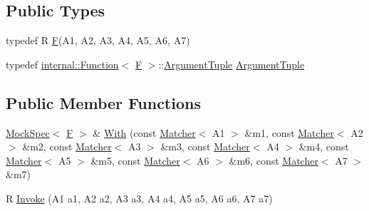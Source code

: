 \subsection*{Public Types}
\begin{DoxyCompactItemize}
\item 
typedef R \hyperlink{classtesting_1_1internal_1_1FunctionMocker_3_01R_07A1_00_01A2_00_01A3_00_01A4_00_01A5_00_01A6_00_01A7_08_4_a2ea0e33d9cc0d1f57d58b4aee98c117c}{F}(A1, A2, A3, A4, A5, A6, A7)
\item 
typedef \hyperlink{structtesting_1_1internal_1_1Function}{internal\+::\+Function}$<$ \hyperlink{classtesting_1_1internal_1_1FunctionMocker_3_01R_07A1_00_01A2_00_01A3_00_01A4_00_01A5_00_01A6_00_01A7_08_4_a2ea0e33d9cc0d1f57d58b4aee98c117c}{F} $>$\+::\hyperlink{classtesting_1_1internal_1_1FunctionMocker_3_01R_07A1_00_01A2_00_01A3_00_01A4_00_01A5_00_01A6_00_01A7_08_4_a313911b9c80b57c8c25f0ad5ef2d0bdc}{Argument\+Tuple} \hyperlink{classtesting_1_1internal_1_1FunctionMocker_3_01R_07A1_00_01A2_00_01A3_00_01A4_00_01A5_00_01A6_00_01A7_08_4_a313911b9c80b57c8c25f0ad5ef2d0bdc}{Argument\+Tuple}
\end{DoxyCompactItemize}
\subsection*{Public Member Functions}
\begin{DoxyCompactItemize}
\item 
\hyperlink{classtesting_1_1internal_1_1MockSpec}{Mock\+Spec}$<$ \hyperlink{classtesting_1_1internal_1_1FunctionMocker_3_01R_07A1_00_01A2_00_01A3_00_01A4_00_01A5_00_01A6_00_01A7_08_4_a2ea0e33d9cc0d1f57d58b4aee98c117c}{F} $>$ \& \hyperlink{classtesting_1_1internal_1_1FunctionMocker_3_01R_07A1_00_01A2_00_01A3_00_01A4_00_01A5_00_01A6_00_01A7_08_4_abaa600e7ae355a1579d1c02a4ea726fb}{With} (const \hyperlink{classtesting_1_1Matcher}{Matcher}$<$ A1 $>$ \&m1, const \hyperlink{classtesting_1_1Matcher}{Matcher}$<$ A2 $>$ \&m2, const \hyperlink{classtesting_1_1Matcher}{Matcher}$<$ A3 $>$ \&m3, const \hyperlink{classtesting_1_1Matcher}{Matcher}$<$ A4 $>$ \&m4, const \hyperlink{classtesting_1_1Matcher}{Matcher}$<$ A5 $>$ \&m5, const \hyperlink{classtesting_1_1Matcher}{Matcher}$<$ A6 $>$ \&m6, const \hyperlink{classtesting_1_1Matcher}{Matcher}$<$ A7 $>$ \&m7)
\item 
R \hyperlink{classtesting_1_1internal_1_1FunctionMocker_3_01R_07A1_00_01A2_00_01A3_00_01A4_00_01A5_00_01A6_00_01A7_08_4_a9088342f6d93448dba290e565c006979}{Invoke} (A1 a1, A2 a2, A3 a3, A4 a4, A5 a5, A6 a6, A7 a7)
\end{DoxyCompactItemize}
